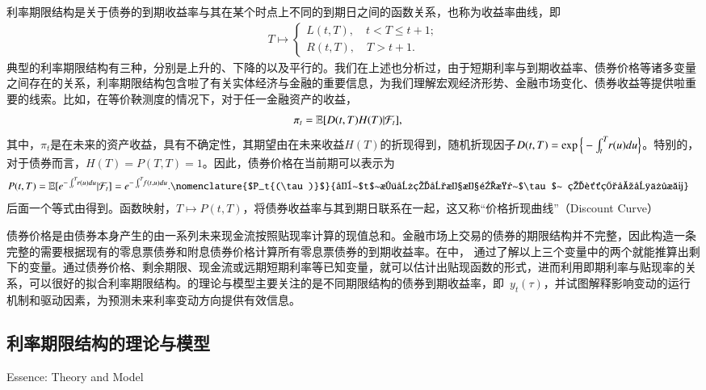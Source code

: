 利率期限结构是关于债券的到期收益率与其在某个时点上不同的到期日之间的函数关系，也称为收益率曲线，即
\begin{align}
 T \mapsto 
  \begin{cases}
   L(t,T), \quad t < T \leq t+1; \\
   R(t,T), \quad T > t+1.
  \end{cases}
\end{align}
典型的利率期限结构有三种，分别是上升的、下降的以及平行的。我们在上述也分析过，由于短期利率与到期收益率、债券价格等诸多变量之间存在的关系，利率期限结构包含啦了有关实体经济与金融的重要信息，为我们理解宏观经济形势、金融市场变化、债券收益等提供啦重要的线索。比如，在等价鞅测度的情况下，对于任一金融资产的收益，
\begin{align}
 \pi_t &= \mathbb{E}[D(t,T)H(T)|\mathcal{F}_t],
\end{align}
其中，$\pi_t$是在未来的资产收益，具有不确定性，其期望由在未来收益$H(T)$的折现得到，随机折现因子$D(t,T)=\exp\Big\{-\int_{t}^{T} \hspace{-.5ex} r(u)du\Big\}$。特别的，对于债券而言，$H(T) = P(T,T) = 1$。因此，债券价格在当前期可以表示为
\begin{align}
 P(t,T) &=  \E[e^{-\int_{t}^{T} \hspace{-.5ex} r(u)du} |\mathcal{F}_t] = e^{ -\int_{t}^{T}\hspace{-.5ex}  f(t,u) du  }. \label{bond-curve}
 \nomenclature{$P_t{(\tau)}$}{在~$t$~时刻的到期期限是~$\tau$~ 的贴现债券价格}
\end{align}
后面一个等式由得到。函数映射，$T\mapsto P(t, T)$，将债券收益率与其到期日联系在一起，这又称``价格折现曲线''（Discount Curve）

债券价格是由债券本身产生的由一系列未来现金流按照贴现率计算的现值总和。金融市场上交易的债券的期限结构并不完整，因此构造一条完整的\ts{}需要根据现有的零息票债券和附息债券价格计算所有零息票债券的到期收益率。在中，
通过了解以上三个变量中的两个就能推算出剩下的变量。通过债券价格、剩余期限、现金流或远期短期利率等已知变量，就可以估计出贴现函数的形式，进而利用即期利率与贴现率的关系，可以很好的拟合利率期限结构。\tsm 的理论与模型主要关注的是不同期限结构的债券到期收益率，即~$y_t{(\tau)}$，并试图解释影响\ts 变动的运行机制和驱动因素，为预测未来利率变动方向提供有效信息。

\subsection{利率期限结构的理论与模型}{Essence: Theory and Model}\label{theory&model}

